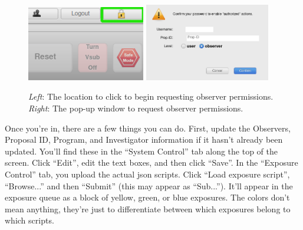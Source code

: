 \begin{figure}
    \centering
    \includegraphics[width=0.46\textwidth]{figs/observing/request.png}
    \includegraphics[width=0.49\textwidth]{figs/observing/request_2.png}
    \caption{\textit{Left}: The location to click to begin requesting observer permissions. \textit{Right}: The pop-up window to request observer permissions.}
    \label{fig:request}
\end{figure}

Once you're in, there are a few things you can do. First, update the Observers, Proposal ID, Program, and Investigator information if it hasn't already been updated. You'll find these in the ``System Control'' tab along the top of the screen. Click ``Edit'', edit the text boxes, and then click ``Save''. In the ``Exposure Control'' tab, you upload the actual json scripts. Click ``Load exposure script'', ``Browse...'' and then ``Submit'' (this may appear as ``Sub...''). It'll appear in the exposure queue as a block of yellow, green, or blue exposures. The colors don't mean anything, they're just to differentiate between which exposures belong to which scripts. \\

